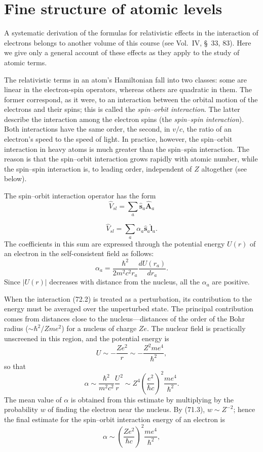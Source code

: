 \section{Fine structure of atomic levels}

A systematic derivation of the formulas for relativistic effects in the interaction of electrons belongs to another volume of this course (see Vol.~IV, \S~33, 83). Here we give only a general account of these effects as they apply to the study of atomic terms.

The relativistic terms in an atom's Hamiltonian fall into two classes: some are linear in the electron-spin operators, whereas others are quadratic in them. The former correspond, as it were, to an interaction between the orbital motion of the electrons and their spins; this is called the \emph{spin--orbit interaction}. The latter describe the interaction among the electron spins (the \emph{spin--spin interaction}). Both interactions have the same order, the second, in $v/c$, the ratio of an electron's speed to the speed of light. In practice, however, the spin--orbit interaction in heavy atoms is much greater than the spin--spin interaction. The reason is that the spin--orbit interaction grows rapidly with atomic number, while the spin--spin interaction is, to leading order, independent of $Z$ altogether (see below).

The spin--orbit interaction operator has the form
\begin{equation}
 \hat V_{sl}=\sum_a\hat{\mathbf s}_a\hat{\mathbf A}_a
 \tag{72.1}
\end{equation}

\begin{equation}
 \hat V_{sl}=\sum_a\alpha_a\hat{\mathbf s}_a\hat{\mathbf l}_a.
 \tag{72.2}
\end{equation}
The coefficients in this sum are expressed through the potential energy $U(r)$ of an electron in the self-consistent field as follows:
\begin{equation}
 \alpha_a=\frac{\hbar^2}{2m^2c^2r_a}\frac{dU(r_a)}{dr_a}.
 \tag{72.3}
\end{equation}
Since $|U(r)|$ decreases with distance from the nucleus, all the $\alpha_a$ are positive.

When the interaction (72.2) is treated as a perturbation, its contribution to the energy must be averaged over the unperturbed state. The principal contribution comes from distances close to the nucleus---distances of the order of the Bohr radius ($\sim\hbar^2/Zme^2$) for a nucleus of charge $Ze$. The nuclear field is practically unscreened in this region, and the potential energy is
\[
 U\sim-\frac{Ze^2}{r}\sim-\frac{Z^2me^4}{\hbar^2},
\]
so that
\[
 \alpha\sim\frac{\hbar^2}{m^2c^2}\frac Ur^2\sim Z^4\left(\frac{e^2}{\hbar c}\right)^2\frac{me^4}{\hbar^2}.
\]
The mean value of $\alpha$ is obtained from this estimate by multiplying by the probability $w$ of finding the electron near the nucleus. By (71.3), $w\sim Z^{-2}$; hence the final estimate for the spin--orbit interaction energy of an electron is
\[
 \alpha\sim\left(\frac{Ze^2}{\hbar c}\right)^2\frac{me^4}{\hbar^2},
\]

